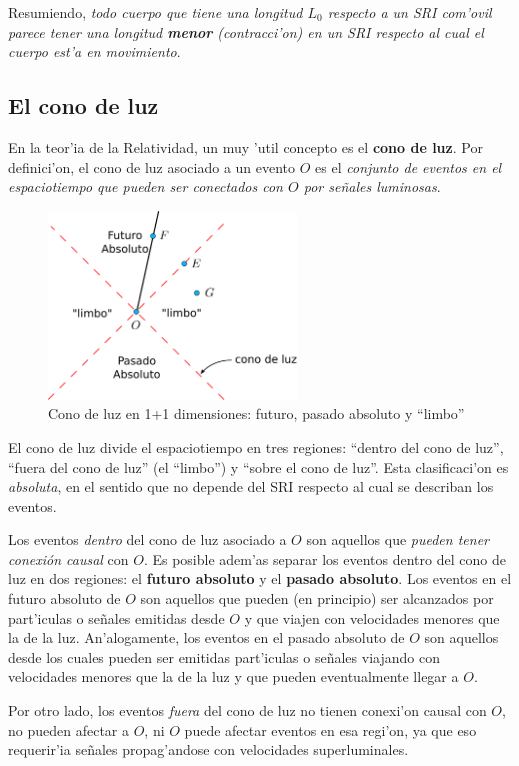 Resumiendo, \textit{todo cuerpo que tiene una longitud $L_0$ respecto a un SRI com'ovil parece tener una longitud \textbf{menor} (contracci'on) en un SRI respecto al cual el cuerpo est'a en movimiento}.

\subsection{El cono de luz}
En la teor'ia de la Relatividad, un muy 'util concepto es el \textbf{cono de luz}. Por definici'on, el cono de luz asociado a un evento $O$ es el \textit{conjunto de eventos en el espaciotiempo que pueden ser conectados con $O$ por se\~nales luminosas}.
\begin{figure}[!h]
\centerline{\includegraphics[height= 5cm]{fig/fig-cono-de-luz-1D.pdf}}
 \caption{Cono de luz en 1+1 dimensiones: futuro, pasado absoluto y ``limbo''}
\label{lc}
\end{figure}
El cono de luz divide el espaciotiempo en tres regiones: ``dentro del cono de luz'', ``fuera del cono de luz'' (el ``limbo'') y ``sobre el cono de luz''. Esta clasificaci'on es \textit{absoluta}, en el sentido que no depende del SRI respecto al cual se describan los eventos.

Los eventos \textit{dentro} del cono de luz asociado a $O$ son aquellos que \textit{pueden tener conexión causal} con $O$. Es posible adem'as separar los eventos dentro del cono de luz en dos regiones: el \textbf{futuro absoluto} y el \textbf{pasado absoluto}. Los eventos en el futuro absoluto de $O$ son aquellos que pueden (en principio) ser alcanzados por part'iculas o se\~nales emitidas desde  $O$  y que viajen con velocidades menores que la de la luz. An'alogamente, los eventos en el pasado absoluto de $O$ son aquellos desde los cuales pueden ser emitidas part'iculas o se\~nales viajando con velocidades menores que la de la luz y que pueden eventualmente llegar a $O$. 

Por otro lado, los eventos \textit{fuera} del cono de luz no tienen conexi'on causal con $O$, no pueden afectar a $O$, ni $O$ puede afectar eventos en esa regi'on, ya que eso requerir'ia se\~nales propag'andose con velocidades superluminales.

